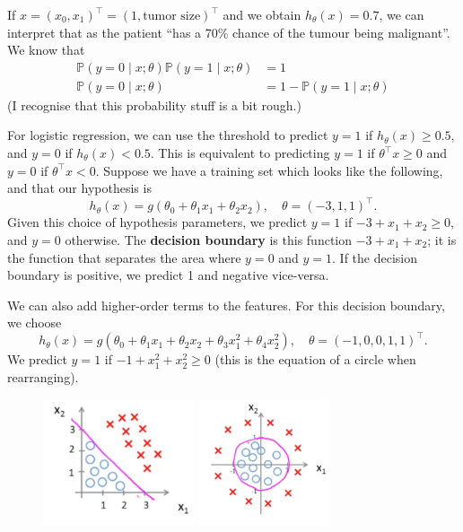 \documentclass[a4paper, 10pt, oneside]{book}
\begin{document}
\begin{exmp}
	If $x = (x_0, x_1)^\top = (1, \text{tumor size})^\top$ and we obtain $h_\theta(x) = 0.7$, we can interpret that as the patient ``has a 70\% chance of the tumour being malignant''. We know that
	\begin{align*}
		\mathbb P(y = 0 \mid x; \theta) \mathbb P(y = 1 \mid x; \theta) &= 1 \\
		\mathbb P(y = 0 \mid x; \theta) &= 1 - \mathbb P(y = 1 \mid x; \theta)
	\end{align*}
	(I recognise that this probability stuff is a bit rough.)
\end{exmp}

For logistic regression, we can use the threshold to predict $y=1$ if $h_\theta(x) \geq 0.5$, and $y=0$ if $h_\theta(x) < 0.5$. This is equivalent to predicting $y=1$ if $\theta^\top x \geq 0$ and $y=0$ if $\theta^\top x < 0$. Suppose we have a training set which looks like the following, and that our hypothesis is
\[h_\theta(x) = g(\theta_0 + \theta_1 x_1 + \theta_2 x_2), \quad \theta = (-3, 1, 1)^\top.\]
Given this choice of hypothesis parameters, we predict $y=1$ if $-3 + x_1 + x_2 \geq 0$, and $y=0$ otherwise. The \textbf{decision boundary} is this function $-3 + x_1 + x_2$; it is the function that separates the area where $y=0$ and $y=1$. If the decision boundary is positive, we predict 1 and negative vice-versa.

We can also add higher-order terms to the features. For this decision boundary, we choose
\[h_\theta(x) = g(\theta_0 + \theta_1 x_1 + \theta_2 x_2 + \theta_3 x_1^2 + \theta_4 x^2_2), \quad \theta = (-1, 0, 0, 1, 1)^\top.\]
We predict $y=1$ if $-1 + x_1^2 + x_2^2 \geq 0$ (this is the equation of a circle when rearranging).

\begin{figure}[H]
	\centering
	\includegraphics[height=10em]{figures/db1}
	\includegraphics[height=10em]{figures/db2}
\end{figure}
\end{document}
